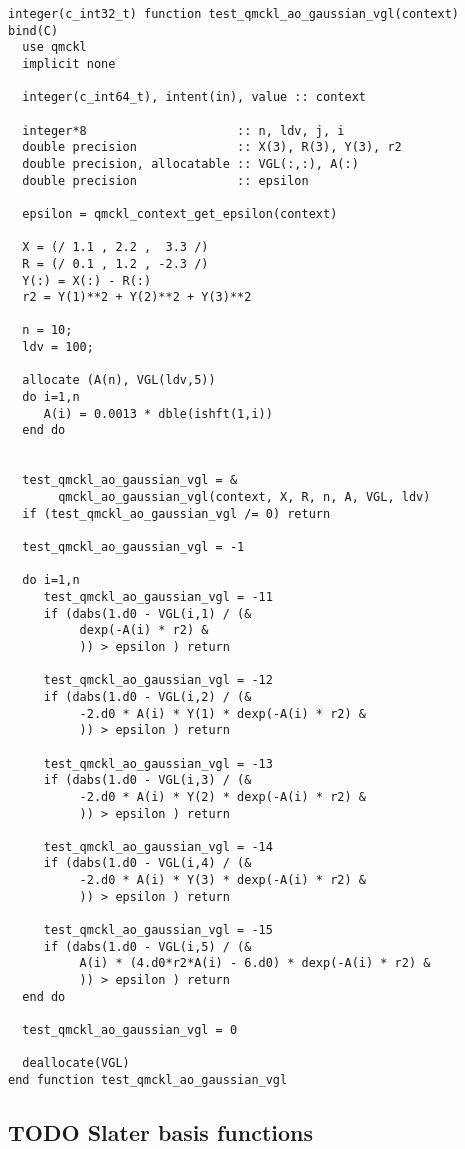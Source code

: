 \begin{verbatim}
integer(c_int32_t) function test_qmckl_ao_gaussian_vgl(context) bind(C)
  use qmckl
  implicit none

  integer(c_int64_t), intent(in), value :: context
  
  integer*8                     :: n, ldv, j, i
  double precision              :: X(3), R(3), Y(3), r2
  double precision, allocatable :: VGL(:,:), A(:)
  double precision              :: epsilon

  epsilon = qmckl_context_get_epsilon(context)

  X = (/ 1.1 , 2.2 ,  3.3 /)
  R = (/ 0.1 , 1.2 , -2.3 /)
  Y(:) = X(:) - R(:)
  r2 = Y(1)**2 + Y(2)**2 + Y(3)**2

  n = 10;
  ldv = 100;

  allocate (A(n), VGL(ldv,5))
  do i=1,n
     A(i) = 0.0013 * dble(ishft(1,i))
  end do


  test_qmckl_ao_gaussian_vgl = &
       qmckl_ao_gaussian_vgl(context, X, R, n, A, VGL, ldv)
  if (test_qmckl_ao_gaussian_vgl /= 0) return

  test_qmckl_ao_gaussian_vgl = -1

  do i=1,n
     test_qmckl_ao_gaussian_vgl = -11
     if (dabs(1.d0 - VGL(i,1) / (&
          dexp(-A(i) * r2) &
          )) > epsilon ) return
     
     test_qmckl_ao_gaussian_vgl = -12
     if (dabs(1.d0 - VGL(i,2) / (&
          -2.d0 * A(i) * Y(1) * dexp(-A(i) * r2) &
          )) > epsilon ) return
     
     test_qmckl_ao_gaussian_vgl = -13
     if (dabs(1.d0 - VGL(i,3) / (&
          -2.d0 * A(i) * Y(2) * dexp(-A(i) * r2) &
          )) > epsilon ) return
     
     test_qmckl_ao_gaussian_vgl = -14
     if (dabs(1.d0 - VGL(i,4) / (&
          -2.d0 * A(i) * Y(3) * dexp(-A(i) * r2) &
          )) > epsilon ) return
     
     test_qmckl_ao_gaussian_vgl = -15
     if (dabs(1.d0 - VGL(i,5) / (&
          A(i) * (4.d0*r2*A(i) - 6.d0) * dexp(-A(i) * r2) &
          )) > epsilon ) return
  end do

  test_qmckl_ao_gaussian_vgl = 0
     
  deallocate(VGL)
end function test_qmckl_ao_gaussian_vgl
\end{verbatim}

\subsection{{\bfseries\sffamily TODO} Slater basis functions}
\label{sec:org796fee9}
